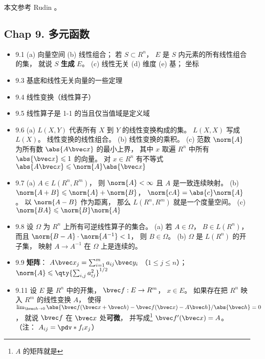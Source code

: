 
本文参考 Rudin \cite{Rudin}。

\subsection{Chap 9. 多元函数}

\begin{itemize}
\item 9.1 (a) 向量空间 (b) 线性组合； 若 $S \subset R^n$， $E$ 是 $S$ 内元素的所有线性组合的集， 就说 $S$ \textbf{生成} $E$。 (c) 线性无关 (d) 维度 (e) 基； 坐标

\item 9.3 基底和线性无关向量的一些定理

\item 9.4 线性变换（线性算子）

\item 9.5 线性算子是 1-1 的当且仅当值域是定义域

\item 9.6 (a) $L(X,Y)$ 代表所有 $X$ 到 $Y$ 的线性变换构成的集。 $L(X,X)$ 写成 $L(X)$。 线性变换的线性组合。 (b) 线性变换的乘积。 (c) 范数 $\norm{A}$ 为所有数 $\abs{A\bvec x}$ 的最小上界， 其中 $x$ 取遍 $R^n$ 中所有 $\abs{\bvec x}\leqslant 1$ 的向量。 对 $x\in R^n$ 有不等式 $\abs{A\bvec x}\leqslant \norm{A}\abs{\bvec x}$

\item 9.7 (a) $A\in L(R^n,R^m)$， 则 $\norm{A}<\infty$ 且 $A$ 是一致连续映射。 (b) $\norm{A+B}\leqslant \norm{A}+\norm{B}$， $\norm{cA} = \abs{c}\norm{A}$。 以 $\norm{A-B}$ 作为距离， 那么 $L(R^n,R^m)$ 就是一个度量空间。 (c) $\norm{BA} \leqslant \norm{B}\norm{A}$

\item 9.8 设 $\Omega$ 为 $R^n$ 上所有可逆线性算子的集合。 (a) 若 $A\in\Omega$， $B\in L(R^n)$， 而且 $\norm{B-A}\cdot\norm{A^{-1}}<1$， 则 $B\in \Omega$。 (b) $\Omega$ 是 $L(R^n)$ 的开子集， 映射 $A\to A^{-1}$ 在 $\Omega$ 上是连续的。

\item 9.9 \textbf{矩阵}： $A\bvec x_j = \sum_{i=1}^m a_{ij}\bvec y_i$ （$1\leqslant j\leqslant n$）； $\norm{A}\leqslant \qty{\sum_{i,j}a_{ij}^2}^{1/2}$

\item 9.11 设 $E$ 是 $R^n$ 中的开集， $\bvec f: E\to R^m$， $x\in E$。 如果存在把 $R^n$ 映入 $R^m$ 的线性变换 $A$， 使得 $\lim_{\bvec h\to 0} \abs{\bvec f(\bvec x+\bvec h) - \bvec f(\bvec x) - A\bvec h}/{\abs{\bvec h}} = 0$， 就说 $\bvec f$ 在 $\bvec x$ 处\textbf{可微}， 并写成\footnote{$A$ 的矩阵就是} $\bvec f'(\bvec x) = A$。 （注： $A_{ij} = \pdv*{f_i}{x_j}$）


\end{itemize}

